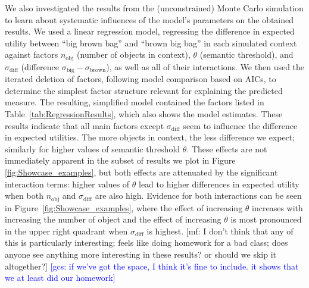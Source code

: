 \documentclass[10pt,a4paper]{article}
\newcommand{\gcs}[1]{\textcolor{blue}{[gcs: #1]}}
\newcommand{\mf}[1]{\textcolor{BrickRed}{[mf: #1]}}
\begin{document}
We also investigated the results from the (unconstrained) Monte Carlo simulation to learn about systematic influences of the model's parameters on the obtained results. We used a linear regression model, regressing the difference in expected utility between ``big brown bag'' and ``brown big bag'' in each simulated context against factors $n_{\text{obj}}$ (number of objects in context), $\theta$ (semantic threshold), and $\sigma_{\text{diff}}$ (difference $\sigma_{\text{big}} - \sigma_{\text{brown}}$), as well as all of their interactions. We then used the iterated deletion of factors, following model comparison based on AICs, to determine the simplest factor structure relevant for explaining the predicted measure. The resulting, simplified model contained the factors listed in Table~\ref{tab:RegressionResults}, which also shows the model estimates. These results indicate that all main factors except $\sigma_{\text{diff}}$ seem to influence the difference in expected utilities. The more objects in context, the less difference we expect; similarly for higher values of semantic threshold $\theta$. These effects are not immediately apparent in the subset of results we plot in Figure \ref{fig:Showcase_examples}, but both effects are attenuated by the significant interaction terms: higher values of $\theta$ lead to higher differences in expected utility when both $n_{\text{obj}}$ and $\sigma_{\text{diff}}$ are also high. Evidence for both interactions can be seen in Figure~\ref{fig:Showcase_examples}, where the effect of increasing $\theta$ increases with increasing the number of object and the effect of increasing $\theta$ is most pronounced in the upper right quadrant when $\sigma_{\text{diff}}$ is highest. \mf{I don't think that any of this is particularly interesting; feels like doing homework for a bad class; does anyone see anything more interesting in these results? or should we skip it altogether?} \gcs{if we've got the space, I think it's fine to include. it shows that we at least did our homework}


%
%
\end{document}
